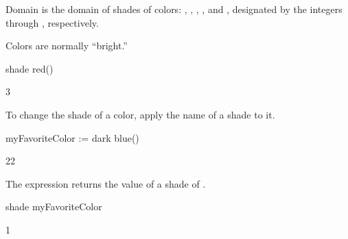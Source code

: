 
Domain  is the domain of shades of colors:
, , , , and ,
designated by the integers  through , respectively.
\begin{xtc}
\begin{xtccomment}
Colors are normally ``bright.''
\end{xtccomment}
\begin{spadsrc}
shade red()
\end{spadsrc}
\begin{TeXOutput}
\begin{fricasmath}{1}
3%
\end{fricasmath}
\end{TeXOutput}
\end{xtc}
\begin{xtc}
\begin{xtccomment}
To change the shade of a color, apply the name of a shade to it.
\end{xtccomment}
\begin{spadsrc}
myFavoriteColor := dark blue() 
\end{spadsrc}
\begin{TeXOutput}
\begin{fricasmath}{2}
\STRING{[}22\STRING{%
]\ from\ the\ }%
\end{fricasmath}
\end{TeXOutput}
\end{xtc}
\begin{xtc}
\begin{xtccomment}
The expression 
returns the value of a shade of .
\end{xtccomment}
\begin{spadsrc}
shade myFavoriteColor 
\end{spadsrc}
\begin{TeXOutput}
\begin{fricasmath}{3}
1%
\end{fricasmath}
\end{TeXOutput}
\end{xtc}
